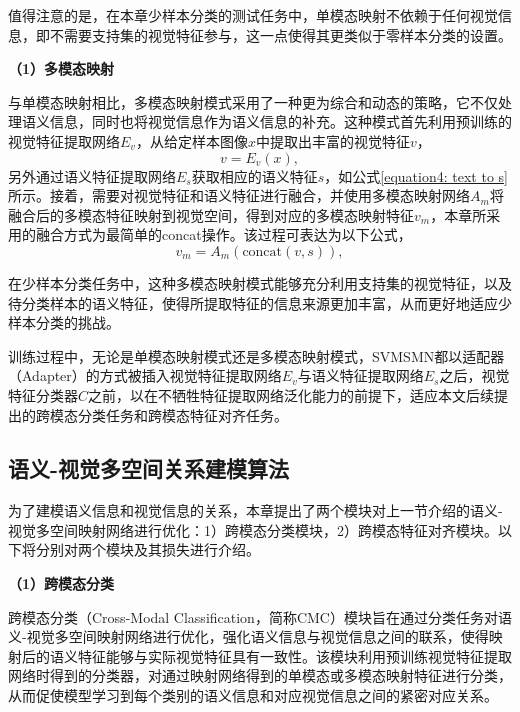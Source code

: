 值得注意的是，在本章少样本分类的测试任务中，单模态映射不依赖于任何视觉信息，即不需要支持集的视觉特征参与，这一点使得其更类似于零样本分类的设置。

\textbf{（1）多模态映射}

与单模态映射相比，多模态映射模式采用了一种更为综合和动态的策略，它不仅处理语义信息，同时也将视觉信息作为语义信息的补充。这种模式首先利用预训练的视觉特征提取网络$E_v$，从给定样本图像$x$中提取出丰富的视觉特征$v$，
\begin{equation}
  \label{equation4: x to v}
  v = E_v(x),
\end{equation}
另外通过语义特征提取网络$E_s$获取相应的语义特征$s$，如公式\ref{equation4: text to s}所示。接着，需要对视觉特征和语义特征进行融合，并使用多模态映射网络$A_m$将融合后的多模态特征映射到视觉空间，得到对应的多模态映射特征$v_m$，本章所采用的融合方式为最简单的concat操作。该过程可表达为以下公式，
\begin{equation}
  \label{equation4: v s to v_m}
  v_m = A_m(\text{concat}(v, s)),
\end{equation}

在少样本分类任务中，这种多模态映射模式能够充分利用支持集的视觉特征，以及待分类样本的语义特征，使得所提取特征的信息来源更加丰富，从而更好地适应少样本分类的挑战。

训练过程中，无论是单模态映射模式还是多模态映射模式，SVMSMN都以适配器（Adapter）的方式被插入视觉特征提取网络$E_v$与语义特征提取网络$E_s$之后，视觉特征分类器$C$之前，以在不牺牲特征提取网络泛化能力的前提下，适应本文后续提出的跨模态分类任务和跨模态特征对齐任务。

\subsection[\hspace{-2pt}语义-视觉多空间关系建模算法]{{\heiti{} \hspace{-8pt}语义-视觉多空间关系建模算法}}\label{section4: 语义-视觉多空间关系建模算法}

为了建模语义信息和视觉信息的关系，本章提出了两个模块对上一节介绍的语义-视觉多空间映射网络进行优化：1）跨模态分类模块，2）跨模态特征对齐模块。以下将分别对两个模块及其损失进行介绍。

\textbf{（1）跨模态分类}

跨模态分类（Cross-Modal Classification，简称CMC）模块旨在通过分类任务对语义-视觉多空间映射网络进行优化，强化语义信息与视觉信息之间的联系，使得映射后的语义特征能够与实际视觉特征具有一致性。该模块利用预训练视觉特征提取网络时得到的分类器，对通过映射网络得到的单模态或多模态映射特征进行分类，从而促使模型学习到每个类别的语义信息和对应视觉信息之间的紧密对应关系。

